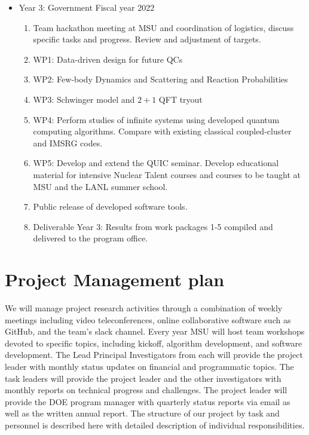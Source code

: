\documentclass[10pt]{article}
\begin{document}
\begin{itemize}
    \item Year 3: Government Fiscal year 2022
    \begin{enumerate}
        \item  Team hackathon meeting at MSU and coordination of logistics, discuss specific tasks and progress. Review and adjustment of targets.
        \item WP1: Data-driven design for future QCs 
\item WP2: Few-body Dynamics and Scattering and Reaction Probabilities
\item WP3: Schwinger model and $2+1$ QFT tryout
\item WP4: Perform studies of  infinite systems using developed quantum computing algorithms. Compare with existing classical coupled-cluster and IMSRG codes.
\item WP5: Develop and extend the QUIC seminar. Develop educational material for intensive Nuclear Talent courses and courses to be taught at MSU and the LANL summer school. 
\item Public release of developed software tools.
\item Deliverable Year 3: Results from work packages 1-5 compiled and delivered to the program office.
    \end{enumerate}
    
\end{itemize}

\section{Project Management plan}
We will manage project research activities through a combination of weekly meetings including
video teleconferences, online collaborative software such as GitHub, and the team’s slack channel.
Every year MSU will host team workshops devoted to specific topics, including kickoff,
algorithm development, and software development. The Lead Principal Investigators from each will provide the project leader with monthly status updates on financial and programmatic
topics. The task leaders will provide the project leader and the other investigators
with monthly reports on technical progress and challenges. The project leader will provide the
DOE program manager with quarterly status reports via email as well as the written annual report.
The structure of our project by task and personnel is described here with detailed
description of individual responsibilities.
\end{document}
